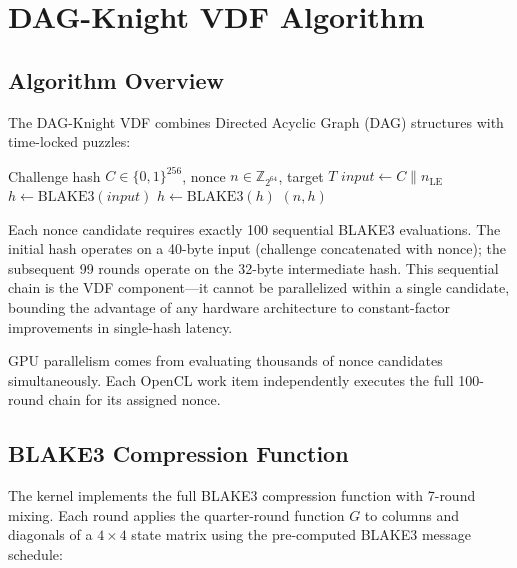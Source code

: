 \documentclass[11pt,a4paper]{article}
\begin{document}
\section{DAG-Knight VDF Algorithm}

\subsection{Algorithm Overview}

The DAG-Knight VDF combines Directed Acyclic Graph (DAG) structures with time-locked puzzles:

\begin{algorithm}
\caption{BLAKE3+VDF Mining (per nonce candidate)}
\begin{algorithmic}[1]
\REQUIRE Challenge hash $C \in \{0,1\}^{256}$, nonce $n \in \mathbb{Z}_{2^{64}}$, target $T$
\STATE $\mathit{input} \leftarrow C \| n_{\mathrm{LE}}$ 
\STATE $h \leftarrow \mathrm{BLAKE3}(\mathit{input})$ 
    \STATE $h \leftarrow \mathrm{BLAKE3}(h)$ 
\ENDFOR
{} 
    \RETURN $(n, h)$ 
\ENDIF
\end{algorithmic}
\end{algorithm}

Each nonce candidate requires exactly 100 sequential BLAKE3 evaluations. The initial hash operates on a 40-byte input (challenge concatenated with nonce); the subsequent 99 rounds operate on the 32-byte intermediate hash. This sequential chain is the VDF component---it cannot be parallelized within a single candidate, bounding the advantage of any hardware architecture to constant-factor improvements in single-hash latency.

GPU parallelism comes from evaluating thousands of nonce candidates simultaneously. Each OpenCL work item independently executes the full 100-round chain for its assigned nonce.

\subsection{BLAKE3 Compression Function}

The kernel implements the full BLAKE3 compression function with 7-round mixing. Each round applies the quarter-round function $G$ to columns and diagonals of a $4 \times 4$ state matrix using the pre-computed BLAKE3 message schedule:
\end{document}
